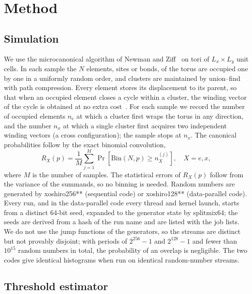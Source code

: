 \documentclass[pre,twocolumn,superscriptaddress,longbibliography,floatfix]{revtex4-2}
\begin{document}
\section{Method}\label{sec:method}

\subsection{Simulation}

We use the microcanonical algorithm of Newman and Ziff~\cite{NewmanZiff00,NewmanZiff01} on tori of $L_x\times L_y$ unit cells. In each sample the $N$ elements, sites or bonds, of the torus are occupied one by one in a uniformly random order, and clusters are maintained by union--find with path compression. Every element stores its displacement to its parent, so that when an occupied element closes a cycle within a cluster, the winding vector of the cycle is obtained at no extra cost~\cite{NewmanZiff01}. For each sample we record the number of occupied elements $n_e$ at which a cluster first wraps the torus in any direction, and the number $n_x$ at which a single cluster first acquires two independent winding vectors (a cross configuration); the sample stops at $n_x$. The canonical probabilities follow by the exact binomial convolution,
\begin{equation}
R_X(p)=\frac1M\sum_{j=1}^{M}\Pr\!\left[\mathrm{Bin}(N,p)\ge n_X^{(j)}\right],\quad X=e,x,
\end{equation}
where $M$ is the number of samples. The statistical errors of $R_X(p)$ follow from the variance of the summands, so no binning is needed. Random numbers are generated by xoshiro256** (sequential code) or xoshiro128** (data-parallel code). Every run, and in the data-parallel code every thread and kernel launch, starts from a distinct 64-bit seed, expanded to the generator state by splitmix64; the seeds are derived from a hash of the run name and are listed with the job lists. We do not use the jump functions of the generators, so the streams are distinct but not provably disjoint; with periods of $2^{256}-1$ and $2^{128}-1$ and fewer than $10^{15}$ random numbers in total, the probability of an overlap is negligible. The two codes give identical histograms when run on identical random-number streams.

\subsection{Threshold estimator}
\end{document}

